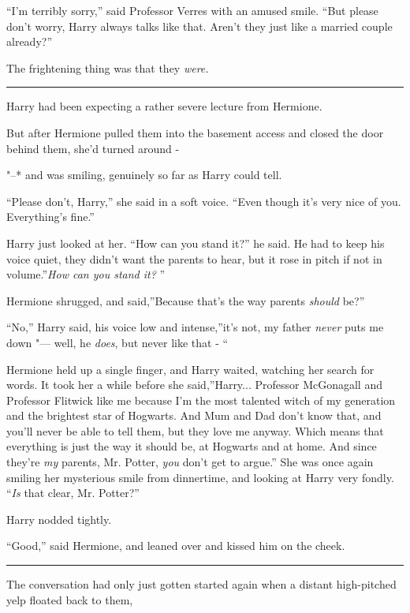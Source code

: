 ``I'm terribly sorry,'' said Professor Verres with an amused smile.
``But please don't worry, Harry always talks like that. Aren't they just
like a married couple already?''

The frightening thing was that they \emph{were.}

\begin{center}\rule{3in}{0.4pt}\end{center}

Harry had been expecting a rather severe lecture from Hermione.

But after Hermione pulled them into the basement access and closed the
door behind them, she'd turned around -

"--* and was smiling, genuinely so far as Harry could tell.

``Please don't, Harry,'' she said in a soft voice. ``Even though it's
very nice of you. Everything's fine.''

Harry just looked at her. ``How can you stand it?'' he said. He had to
keep his voice quiet, they didn't want the parents to hear, but it rose
in pitch if not in volume.''\emph{How can you stand it?} ''

Hermione shrugged, and said,''Because that's the way parents
\emph{should} be?''

``No,'' Harry said, his voice low and intense,''it's not, my father
\emph{never} puts me down "--- well, he \emph{does}, but never like that -
``

Hermione held up a single finger, and Harry waited, watching her search
for words. It took her a while before she said,''Harry... Professor
McGonagall and Professor Flitwick like me because I'm the most talented
witch of my generation and the brightest star of Hogwarts. And Mum and
Dad don't know that, and you'll never be able to tell them, but they
love me anyway. Which means that everything is just the way it should
be, at Hogwarts and at home. And since they're \emph{my} parents, Mr.
Potter, \emph{you} don't get to argue.'' She was once again smiling her
mysterious smile from dinnertime, and looking at Harry very fondly.
``\emph{Is} that clear, Mr. Potter?''

Harry nodded tightly.

``Good,'' said Hermione, and leaned over and kissed him on the cheek.

\begin{center}\rule{3in}{0.4pt}\end{center}

The conversation had only just gotten started again when a distant
high-pitched yelp floated back to them,

